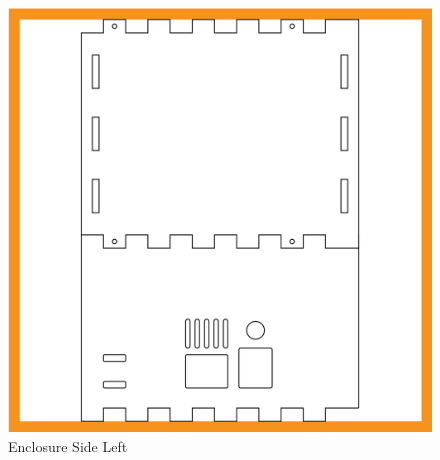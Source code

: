 \begin{figure}[h]
	\centering
	\includegraphics[width=1\textwidth]{packaging-design/side2.png}
	\caption{Enclosure Side Left}
	\label{fig:side2}
\end{figure}
